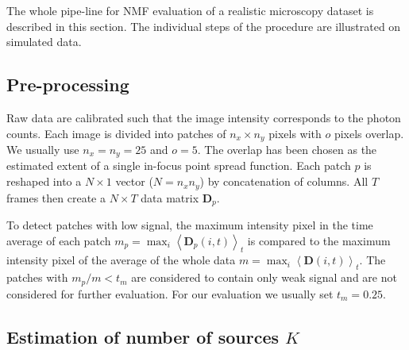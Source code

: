 The whole pipe-line for NMF evaluation of a realistic microscopy dataset is described in this section.  The individual steps of the procedure are illustrated on simulated data. 


\subsection{Pre-processing \label{sec:preproc}}

Raw data are calibrated such that the image intensity corresponds to the photon counts. Each image is divided into patches of $n_x\times n_y$ pixels with $o$ pixels overlap. We usually use $n_x=n_y=25$ and $o = 5$. The overlap has been chosen as the estimated extent of a single in-focus point spread function. Each patch $p$ is reshaped into a $N\times1$ vector ($N=n_x n_y$)  by concatenation of columns. All $T$ frames then create a $N \times T$ data matrix $\bm{D}_{p}$.

To detect patches with low signal, the maximum intensity pixel in the time average of each patch $m_{p}=\max_{i}\left\langle \bm{D}_{p}(i,t)\right\rangle _{t}$ is compared to the maximum intensity pixel of the average of the whole data $m=\max_{i}\left\langle \bm{D}(i,t)\right\rangle _{t}$. The patches with $m_{p}/m< t_{m}$ are considered to contain only weak signal and are not considered for further evaluation. For our evaluation we usually set $t_{m}=0.25.$

\subsection{Estimation of number of sources $K$\label{sub:Estimation-of-number-of-sources}}

